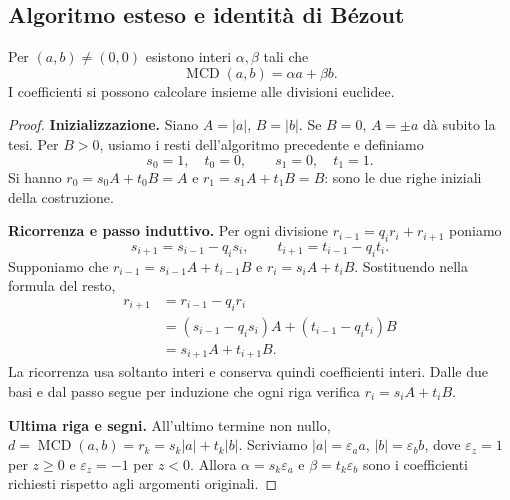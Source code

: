 \subsection{Algoritmo esteso e identità di Bézout}
\begin{teorema}\label{teo:bezout}
Per $(a,b)\ne(0,0)$ esistono interi $\alpha,\beta$ tali che
\[
\operatorname{MCD}(a,b)=\alpha a+\beta b.
\]
I coefficienti si possono calcolare insieme alle divisioni euclidee.
\end{teorema}
\begin{proof}
\textbf{Inizializzazione.} Siano $A=|a|$, $B=|b|$. Se $B=0$, $A=\pm a$ dà subito la tesi. Per $B>0$, usiamo i resti dell'algoritmo precedente e definiamo
\[
s_0=1,\quad t_0=0,\qquad s_1=0,\quad t_1=1.
\]
Si hanno $r_0=s_0A+t_0B=A$ e $r_1=s_1A+t_1B=B$: sono le due righe iniziali della costruzione.

\textbf{Ricorrenza e passo induttivo.} Per ogni divisione $r_{i-1}=q_i r_i+r_{i+1}$ poniamo
\[
s_{i+1}=s_{i-1}-q_i s_i,\qquad t_{i+1}=t_{i-1}-q_i t_i.
\]
Supponiamo che $r_{i-1}=s_{i-1}A+t_{i-1}B$ e $r_i=s_iA+t_iB$. Sostituendo nella formula del resto,
\[
\begin{aligned}
r_{i+1}&=r_{i-1}-q_i r_i\\
&=(s_{i-1}-q_i s_i)A+(t_{i-1}-q_i t_i)B\\
&=s_{i+1}A+t_{i+1}B.
\end{aligned}
\]
La ricorrenza usa soltanto interi e conserva quindi coefficienti interi. Dalle due basi e dal passo segue per induzione che ogni riga verifica $r_i=s_iA+t_iB$.

\textbf{Ultima riga e segni.} All'ultimo termine non nullo, $d=\operatorname{MCD}(a,b)=r_k=s_k|a|+t_k|b|$. Scriviamo $|a|=\varepsilon_a a$, $|b|=\varepsilon_b b$, dove $\varepsilon_z=1$ per $z\ge0$ e $\varepsilon_z=-1$ per $z<0$. Allora $\alpha=s_k\varepsilon_a$ e $\beta=t_k\varepsilon_b$ sono i coefficienti richiesti rispetto agli argomenti originali.
\end{proof}

